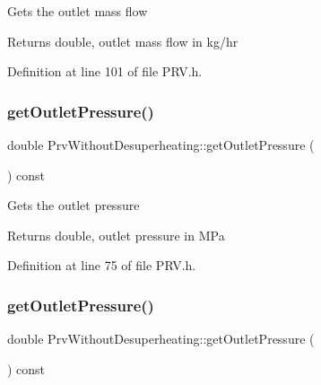 Gets the outlet mass flow \begin{DoxyReturn}{Returns}
double, outlet mass flow in kg/hr 
\end{DoxyReturn}


Definition at line 101 of file P\+R\+V.\+h.

\mbox{\label{class_prv_without_desuperheating_ae1d335703442deec2f2c2f93e4c862f2}} 
\subsubsection{\texorpdfstring{get\+Outlet\+Pressure()}{getOutletPressure()}\hspace{0.1cm}{\footnotesize\ttfamily [1/3]}}
{\footnotesize\ttfamily double Prv\+Without\+Desuperheating\+::get\+Outlet\+Pressure (\begin{DoxyParamCaption}{ }\end{DoxyParamCaption}) const\hspace{0.3cm}{\ttfamily [inline]}}

Gets the outlet pressure

\begin{DoxyReturn}{Returns}
double, outlet pressure in M\+Pa 
\end{DoxyReturn}


Definition at line 75 of file P\+R\+V.\+h.

\mbox{\label{class_prv_without_desuperheating_ae1d335703442deec2f2c2f93e4c862f2}} 
\subsubsection{\texorpdfstring{get\+Outlet\+Pressure()}{getOutletPressure()}\hspace{0.1cm}{\footnotesize\ttfamily [2/3]}}
{\footnotesize\ttfamily double Prv\+Without\+Desuperheating\+::get\+Outlet\+Pressure (\begin{DoxyParamCaption}{ }\end{DoxyParamCaption}) const\hspace{0.3cm}{\ttfamily [inline]}}

